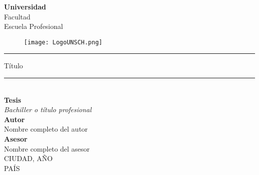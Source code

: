 	\begin{titlepage}
		\begin{center}
			{\LARGE \textbf{Universidad}}\\
			\vspace{0.2cm}
				{\large Facultad}\\
			\vspace{0.2cm}
				{\large Escuela Profesional}\\
			\vspace{0.75cm}
				\begin{figure}[h]
					\centering
					\texttt{[image: LogoUNSCH.png]}
				\end{figure}
			\vspace{.70cm}
			\textcolor{Azul}{\rule{150mm}{0.5mm}}
				\vspace{2mm}
					\begin{spacing}{1.5}
						{\Large Título}
					\end{spacing}
				\vspace{2mm}
			\textcolor{Azul}{\rule{150mm}{0.5mm}}\\
			\vspace{0.2cm}
				{\bf Tesis}\\
			\vspace{0.2cm}
				{\textit{Bachiller o título profesional}}\\
			\vspace{0.2cm}
				{\bf Autor}\\
			\vspace{2mm}
				{Nombre completo del autor}\\
			\vspace{4mm}
				{\bf Asesor}\\
			\vspace{2mm}
				{Nombre completo del asesor}\\
			\vspace{16mm}
				{CIUDAD, AÑO}\\
			\vspace{2mm}
				{PAÍS}	
		\end{center}
	\end{titlepage}